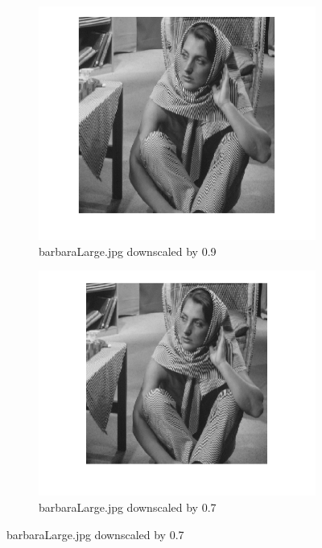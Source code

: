 \documentclass{article}
\begin{document}
\begin{figure}
    \centering
    \begin{subfigure}[b]{0.8\linewidth}
        \centering
        \includegraphics[width=\linewidth]{barb09.png}
        \caption{barbaraLarge.jpg downscaled by 0.9}
    \end{subfigure}
    \begin{subfigure}[b]{0.4\linewidth}
        \centering
        \includegraphics[width=\linewidth]{barb07.png}
        \caption{barbaraLarge.jpg downscaled by 0.7}
    \end{subfigure}

\end{figure}
\end{document}
